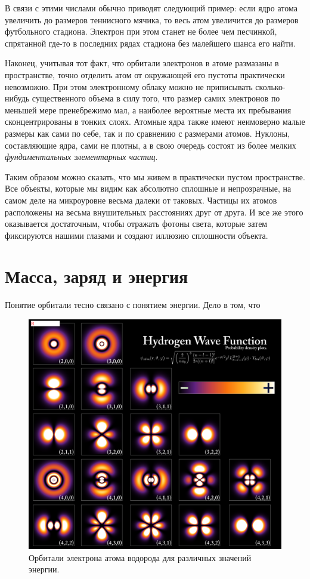 В связи с этими числами обычно приводят следующий пример: если ядро атома увеличить до размеров теннисного мячика, то весь атом увеличится до размеров футбольного стадиона.
Электрон при этом станет не более чем песчинкой, спрятанной где-то в последних рядах стадиона без малейшего шанса его найти.

Наконец, учитывая тот факт, что орбитали электронов в атоме размазаны в пространстве, точно отделить атом от окружающей его пустоты практически невозможно.
При этом электронному облаку можно не приписывать сколько-нибудь существенного объема в силу того, что размер самих электронов по меньшей мере пренебрежимо мал, а наиболее вероятные места их пребывания сконцентрированы в тонких слоях.
Атомные ядра также имеют неимоверно малые размеры как сами по себе, так и по сравнению с размерами атомов.
Нуклоны, составляющие ядра, сами не плотны, а в свою очередь состоят из более мелких \textit{фундаментальных элементарных частиц}.

Таким образом можно сказать, что мы живем в практически пустом пространстве.
Все объекты, которые мы видим как абсолютно сплошные и непрозрачные, на самом деле на микроуровне весьма далеки от таковых.
Частицы их атомов расположены на весьма внушительных расстояниях друг от друга.
И все же этого оказывается достаточным, чтобы отражать фотоны света, которые затем фиксируются нашими глазами и создают иллюзию сплошности объекта. 


\section*{Масса, заряд и энергия}

Понятие орбитали тесно связано с понятием энергии.
Дело в том, что 

\begin{figure}[t!]
   \centering
   \includegraphics[scale=0.2]{images/hydrogen_electron_energy}
   \caption{Орбитали электрона атома водорода для различных значений энергии.}
   \label{fig:hydrogen_electron_energy}
\end{figure}




